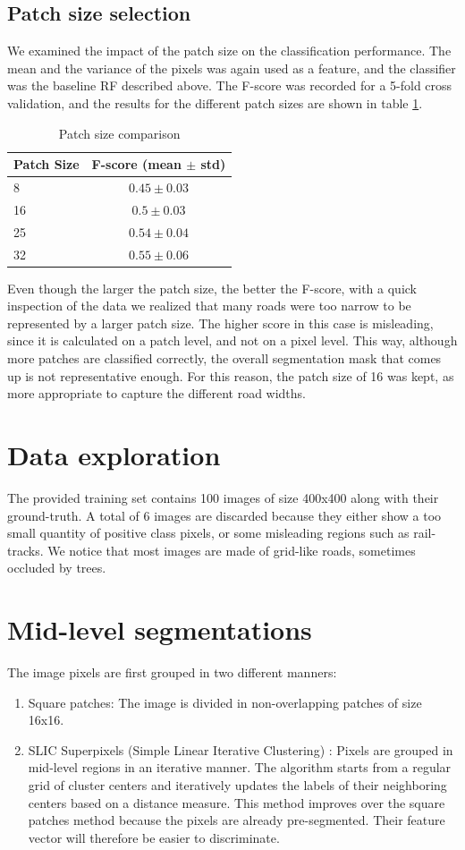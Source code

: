 \documentclass[10pt,conference,compsocconf]{IEEEtran}
\begin{document}
	\subsection{Patch size selection}
	We examined the impact of the patch size on the classification performance.
  The mean and the variance of the pixels was again used as a feature, and the
  classifier was the baseline RF described above. The F-score was recorded for a
  5-fold cross validation, and the results for the different patch sizes are
  shown in table \ref{patch_size}.
	\begin{table}[h]	
	\centering
	\begin{tabular}{lc}
		\hline \hline		
		\textbf{Patch Size} &  \textbf{F-score (mean $\pm$ std)} \\
		\hline
		8 & $0.45 \pm 0.03$ \\
		16 & $0.5 \pm 0.03$ \\
		25 & $0.54 \pm 0.04$ \\
		32 & $0.55 \pm 0.06$ \\
		\hline
	\end{tabular}
	\caption{\label{patch_size}Patch size comparison}
	\end{table}
	Even though the larger the patch size, the better the F-score, with a quick inspection of the data we realized that many roads were too narrow to be represented by a larger patch size. The higher score in this case is misleading, since it is calculated on a patch level, and not on a pixel level. This way, although more patches are classified correctly, the overall segmentation mask that comes up is not representative enough. For this reason, the patch size of 16 was kept, as more appropriate to capture the different road widths.
	\section{Data exploration}
	\label{sec:orgheadline7}
	The provided training set contains 100 images of size 400x400 along with their ground-truth. A total of 6 images are discarded because they either show a too small quantity of positive class pixels, or some misleading regions such as rail-tracks. 
	We notice that most images are made of grid-like roads, sometimes occluded by trees. 
	\section{Mid-level segmentations}
	\label{sec:orgheadline8}
	The image pixels are first grouped in two different manners:
	\begin{enumerate}
		\item Square patches: The image is divided in non-overlapping patches of size 16x16.
		\item SLIC Superpixels (Simple Linear Iterative Clustering) \cite{achanta12}: Pixels are grouped in mid-level regions in an iterative manner. The algorithm starts from a regular grid of cluster centers and iteratively updates the labels of their neighboring centers based on a distance measure. This method improves over the square patches method because the pixels are already pre-segmented. Their feature vector will therefore be easier to discriminate.
	\end{enumerate}
\end{document}

